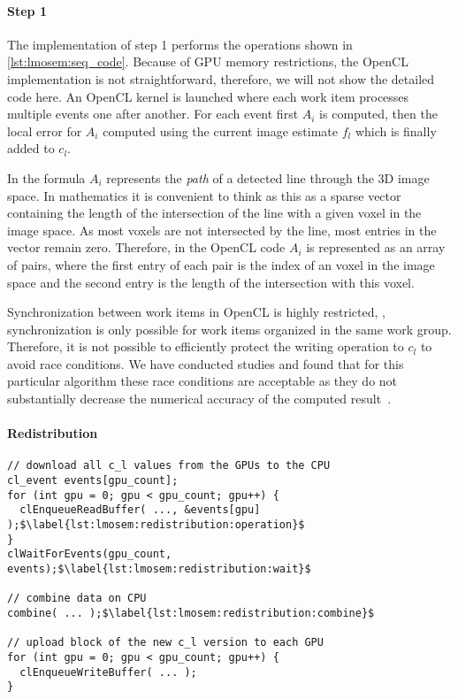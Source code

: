 \paragraph{Step 1}
The implementation of step 1 performs the operations shown in \autoref{lst:lmosem:seq_code}.
Because of GPU memory restrictions, the OpenCL implementation is not straightforward, therefore, we will not show the detailed code here.
An OpenCL kernel is launched where each work item processes multiple events one after another.
For each event first $A_i$ is computed, then the local error for $A_i$ computed using the current image estimate $f_l$ which is finally added to $c_l$.

In the formula $A_i$ represents the \emph{path} of a detected line through the 3D image space.
In mathematics it is convenient to think as this as a sparse vector containing the length of the intersection of the line with a given voxel in the image space.
As most voxels are not intersected by the line, most entries in the vector remain zero.
Therefore, in the OpenCL code $A_i$ is represented as an array of pairs, where the first entry of each pair is the index of an voxel in the image space and the second entry is the length of the intersection with this voxel.

Synchronization between work items in OpenCL is highly restricted, \ie, synchronization is only possible for work items organized in the same work group.
Therefore, it is not possible to efficiently protect the writing operation to $c_l$ to avoid race conditions.
We have conducted studies and found that for this particular algorithm these race conditions are acceptable as they do not substantially decrease the numerical accuracy of the computed result~\cite{SchellmannGoMeKoScWuBu2009}.


\paragraph{Redistribution}

\begin{lstlisting}[float,
  caption={OpenCL pseudocode for the redistribution phase},
  label={lst:lmosem:redistribution}]
// download all c_l values from the GPUs to the CPU
cl_event events[gpu_count];
for (int gpu = 0; gpu < gpu_count; gpu++) {
  clEnqueueReadBuffer( ..., &events[gpu] );$\label{lst:lmosem:redistribution:operation}$
}
clWaitForEvents(gpu_count, events);$\label{lst:lmosem:redistribution:wait}$

// combine data on CPU
combine( ... );$\label{lst:lmosem:redistribution:combine}$

// upload block of the new c_l version to each GPU
for (int gpu = 0; gpu < gpu_count; gpu++) {
  clEnqueueWriteBuffer( ... );
}
\end{lstlisting}

